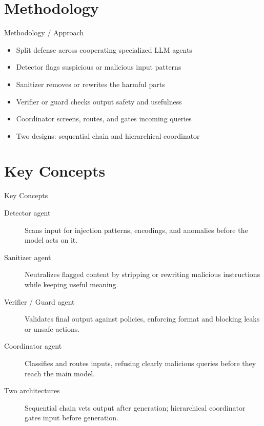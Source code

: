 \documentclass[10pt]{beamer}
\begin{document}
\section{Methodology}
\begin{frame}[allowframebreaks]{Methodology / Approach}
\begin{itemize}
  \item Split defense across cooperating specialized LLM agents
  \item Detector flags suspicious or malicious input patterns
  \item Sanitizer removes or rewrites the harmful parts
  \item Verifier or guard checks output safety and usefulness
  \item Coordinator screens, routes, and gates incoming queries
  \item Two designs: sequential chain and hierarchical coordinator
\end{itemize}
\end{frame}

\section{Key Concepts}
\begin{frame}[allowframebreaks]{Key Concepts}
  \begin{description}
    \item[Detector agent] Scans input for injection patterns, encodings, and anomalies before the model acts on it.
    \item[Sanitizer agent] Neutralizes flagged content by stripping or rewriting malicious instructions while keeping useful meaning.
    \item[Verifier / Guard agent] Validates final output against policies, enforcing format and blocking leaks or unsafe actions.
    \item[Coordinator agent] Classifies and routes inputs, refusing clearly malicious queries before they reach the main model.
    \item[Two architectures] Sequential chain vets output after generation; hierarchical coordinator gates input before generation.
  \end{description}
\end{frame}
\end{document}

